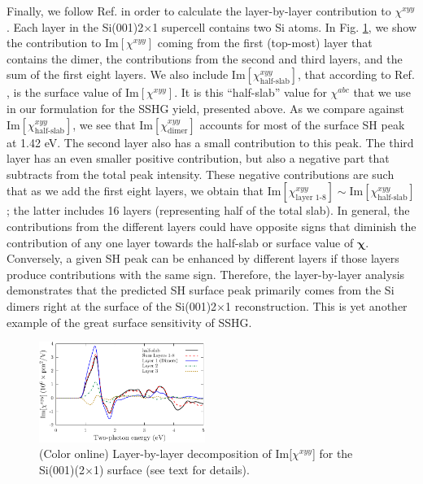 \documentclass[aps,prb,10pt,showpacs,letterpaper,twocolumn]{revtex4-1}
\begin{document}
Finally, we follow Ref.  in order to calculate the
layer-by-layer contribution to $\chi^{xyy}$.  Each layer in the
Si(001)2$\times$1 supercell contains two Si atoms. In Fig. \ref{fig:fig8}, we
show the contribution to Im$[\chi^{xyy}]$ coming from the first (top-most) layer
that contains the dimer, the contributions from the second and third layers, and
the sum of the first eight layers. We also include
Im$[\chi^{xyy}_{\text{half-slab}}]$, that according to Ref.
, is the surface value of Im$[\chi^{xyy}]$. It is this
``half-slab'' value for $\chi^{abc}$ that we use in our formulation for the SSHG
yield, presented above. As we compare against
Im$[\chi^{xyy}_{\text{half-slab}}]$, we see that Im$[\chi^{xyy}_{\text{dimer}}]$
accounts for most of the surface SH peak at 1.42 eV. The second layer also has a
small contribution to this peak. The third layer has an even smaller positive
contribution, but also a negative part that subtracts from the total peak
intensity. These negative contributions are such that as we add the first eight
layers, we obtain that Im$[\chi^{xyy}_{\text{layer 1-8}}]\sim
\text{Im}[\chi^{xyy}_{\text{half-slab}}]$; the latter includes 16 layers
(representing half of the total slab). In general, the contributions from the
different layers could have opposite signs that diminish the contribution of any
one layer towards the half-slab or surface value of $\boldsymbol{\chi}$.
Conversely, a given SH peak can be enhanced by different layers if those layers
produce contributions with the same sign. Therefore, the layer-by-layer analysis
demonstrates that the predicted SH surface peak primarily comes from the Si
dimers right at the surface of the Si(001)2$\times$1 reconstruction. This is yet
another example of the great surface sensitivity of SSHG.

\begin{figure}[b]
\includegraphics[width=0.48\textwidth]{fig8}
\caption{(Color online) Layer-by-layer decomposition of Im[$\chi^{xyy}$] for
the Si(001)(2$\times$1) surface (see text for details).}
\label{fig:fig8}
\end{figure}
\end{document}

